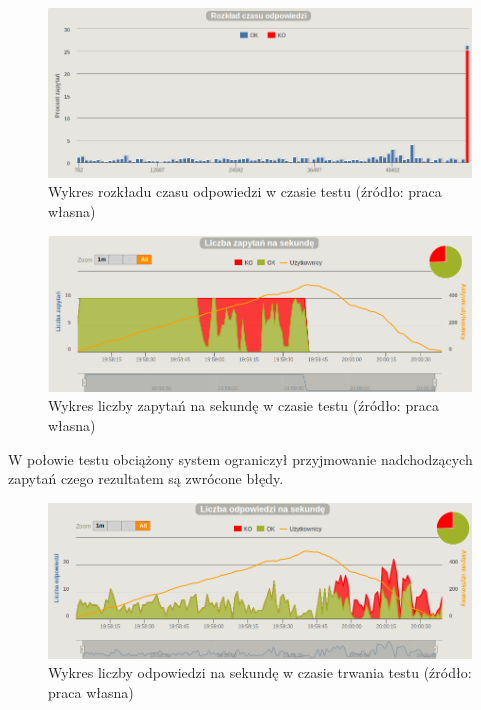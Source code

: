 \documentclass[12pt,twoside]{article}
\begin{document}
\begin{figure}[htbp]
\centering
\includegraphics[resolution=150]{test_results/elixir/fibonacci/screenshots/distribution.png}
\caption{Wykres rozkładu czasu odpowiedzi w czasie testu (źródło: praca własna)}
\end{figure}

\begin{figure}[htbp]
\centering
\includegraphics[resolution=150]{test_results/elixir/fibonacci/screenshots/requests.png}
\caption{Wykres liczby zapytań na sekundę w czasie testu (źródło: praca własna)}
\end{figure}

W połowie testu obciążony system ograniczył przyjmowanie nadchodzących
zapytań czego rezultatem są zwrócone błędy.

\begin{figure}[htbp]
\centering
\includegraphics[resolution=150]{test_results/elixir/fibonacci/screenshots/responses.png}
\caption{Wykres liczby odpowiedzi na sekundę w czasie trwania testu (źródło: praca własna)}
\end{figure}
\end{document}
